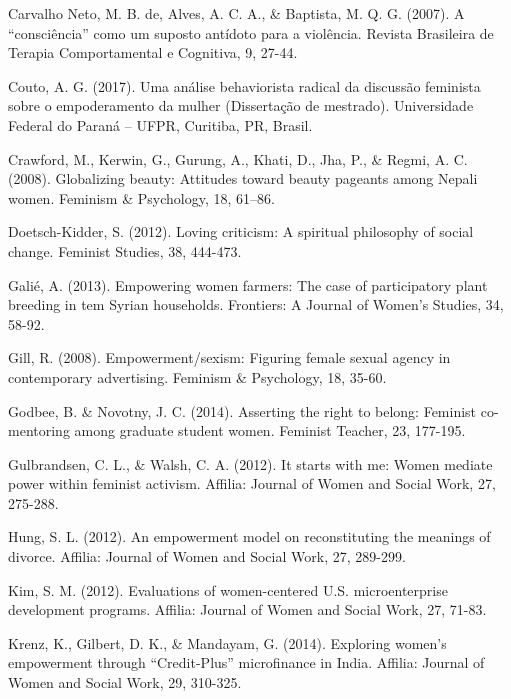 \hangindent=25pt
\noindent Carvalho Neto, M. B. de, Alves, A. C. A., \& Baptista, M. Q. G. (2007). A ``consciência'' como um suposto antídoto para a violência. Revista Brasileira de Terapia Comportamental e Cognitiva, 9, 27-44.

\hangindent=25pt
\noindent Couto, A. G. (2017). Uma análise behaviorista radical da discussão feminista sobre o empoderamento da mulher (Dissertação de mestrado). Universidade Federal do Paraná – UFPR, Curitiba, PR, Brasil.

\hangindent=25pt
\noindent Crawford, M., Kerwin, G., Gurung, A., Khati, D., Jha, P., \& Regmi, A. C. (2008). Globalizing beauty: Attitudes toward beauty pageants among Nepali women. Feminism \& Psychology, 18, 61–86.

\hangindent=25pt
\noindent Doetsch-Kidder, S. (2012). Loving criticism: A spiritual philosophy of social change. Feminist Studies, 38, 444-473.

\hangindent=25pt
\noindent Galié, A. (2013). Empowering women farmers: The case of participatory plant breeding in tem Syrian households. Frontiers: A Journal of Women’s Studies, 34, 58-92.

\hangindent=25pt
\noindent Gill, R. (2008). Empowerment/sexism: Figuring female sexual agency in contemporary advertising. Feminism \& Psychology, 18, 35-60.

\hangindent=25pt
\noindent Godbee, B. \& Novotny, J. C. (2014). Asserting the right to belong: Feminist co-mentoring among graduate student women. Feminist Teacher, 23, 177-195.

\hangindent=25pt
\noindent Gulbrandsen, C. L., \& Walsh, C. A. (2012). It starts with me: Women mediate power within feminist activism. Affilia: Journal of Women and Social Work, 27, 275-288.

\hangindent=25pt
\noindent Hung, S. L. (2012). An empowerment model on reconstituting the meanings of divorce. Affilia: Journal of Women and Social Work, 27, 289-299.

\hangindent=25pt
\noindent Kim, S. M. (2012). Evaluations of women-centered U.S. microenterprise development programs. Affilia: Journal of Women and Social Work, 27, 71-83.

\hangindent=25pt
\noindent Krenz, K., Gilbert, D. K., \& Mandayam, G. (2014). Exploring women’s empowerment through ``Credit-Plus'' microfinance in India. Affilia: Journal of Women and Social Work, 29, 310-325.

